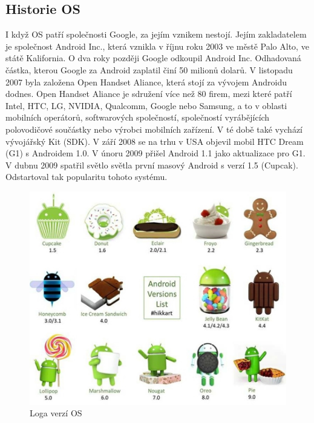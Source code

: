 \documentclass{vskpou} %
\begin{document}
\subsection{Historie OS}
I když OS patří společnosti Google, za jejím vznikem nestojí. Jejím zakladatelem je společnost Android Inc., která vznikla v říjnu roku 2003 ve městě Palo Alto, ve státě Kalifornia. O dva roky později Google odkoupil Android Inc. Odhadovaná částka, kterou Google za Android zaplatil činí 50 milionů dolarů. V listopadu 2007 byla založena Open Handset Aliance, která stojí za vývojem Androidu dodnes. Open Handset Aliance je sdružení více než 80 firem, mezi které patří Intel, HTC, LG, NVIDIA, Qualcomm, Google nebo Samsung, a to v oblasti mobilních operátorů, softwarových společností, společností vyrábějících polovodičové součástky nebo výrobci mobilních zařízení. V té době také vychází vývojářský Kit (SDK). V září 2008 se na trhu v USA objevil mobil HTC Dream (G1) s Androidem 1.0. V únoru 2009 přišel Android 1.1 jako aktualizace pro G1. V dubnu 2009 spatřil světlo světla první masový Android s verzí 1.5 (Cupcak). Odstartoval tak popularitu tohoto systému.\cite{10} 
\newpage
\begin{figure}[h!]
\centering
\includegraphics[scale=0.5]{images/1.jpg}
\caption{Loga verzí OS}
\label{1}
\end{figure}
\clearpage
\end{document}

